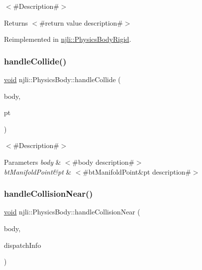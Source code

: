 $<$\#\+Description\#$>$

\begin{DoxyReturn}{Returns}
$<$\#return value description\#$>$ 
\end{DoxyReturn}


Reimplemented in \mbox{\hyperlink{classnjli_1_1_physics_body_rigid_ad65b1292303642832a18f864bb23cff5}{njli\+::\+Physics\+Body\+Rigid}}.

\mbox{\label{classnjli_1_1_physics_body_a5e3c626da8fdf32375e0f16f6187934d}} 
\subsubsection{\texorpdfstring{handle\+Collide()}{handleCollide()}}
{\footnotesize\ttfamily \mbox{\hyperlink{_thread_8h_af1e856da2e658414cb2456cb6f7ebc66}{void}} njli\+::\+Physics\+Body\+::handle\+Collide (\begin{DoxyParamCaption}\item[{\mbox{\hyperlink{classnjli_1_1_physics_body}{Physics\+Body}} $\ast$}]{body,  }\item[{const bt\+Manifold\+Point \&}]{pt }\end{DoxyParamCaption})}

$<$\#\+Description\#$>$


\begin{DoxyParams}{Parameters}
{\em body} & $<$\#body description\#$>$ \\
\hline
{\em bt\+Manifold\+Point\&pt} & $<$\#bt\+Manifold\+Point\&pt description\#$>$ \\
\hline
\end{DoxyParams}
\mbox{\label{classnjli_1_1_physics_body_ae317118b0cad6699ce9d7c1aa27db7fa}} 
\subsubsection{\texorpdfstring{handle\+Collision\+Near()}{handleCollisionNear()}}
{\footnotesize\ttfamily \mbox{\hyperlink{_thread_8h_af1e856da2e658414cb2456cb6f7ebc66}{void}} njli\+::\+Physics\+Body\+::handle\+Collision\+Near (\begin{DoxyParamCaption}\item[{\mbox{\hyperlink{classnjli_1_1_physics_body}{Physics\+Body}} $\ast$}]{body,  }\item[{const bt\+Dispatcher\+Info \&}]{dispatch\+Info }\end{DoxyParamCaption})}

